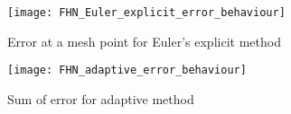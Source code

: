 \begin{figure}
    \texttt{[image: FHN\_Euler\_explicit\_error\_behaviour]}
    \caption{Error at a mesh point for Euler's explicit method}
    \label{fig:Euler_explicit_error}
 \end{figure}
\begin{figure}
   \texttt{[image: FHN\_adaptive\_error\_behaviour]}
   \caption{Sum of error for adaptive method}
   \label{fig:adaptive_error}
\end{figure}